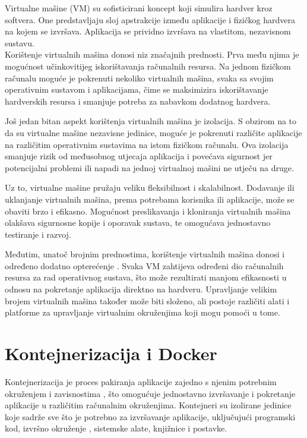 \documentclass[times, utf8, diplomski]{fer}
\begin{document}
Virtualne mašine  (VM) su sofisticirani koncept koji simulira hardver kroz softvera. One predstavljaju sloj apstrakcije između aplikacije i fizičkog hardvera na kojem se izvršava. Aplikacija se prividno izvršava na vlastitom, nezavisnom sustavu. \\

Korištenje virtualnih mašina donosi niz značajnih prednosti. Prva među njima je mogućnost učinkovitijeg iskorištavanja računalnih resursa. Na jednom fizičkom računalu moguće je pokrenuti nekoliko virtualnih mašina, svaka sa svojim operativnim sustavom i aplikacijama, čime se maksimizira iskorištavanje hardverskih resursa i smanjuje potreba za nabavkom dodatnog hardvera.

Još jedan bitan aspekt korištenja virtualnih mašina je izolacija. S obzirom na to da su virtualne mašine nezavisne jedinice, moguće je pokrenuti različite aplikacije na različitim operativnim sustavima na istom fizičkom računalu. Ova izolacija smanjuje rizik od međusobnog utjecaja aplikacija i povećava sigurnost jer potencijalni problemi ili napadi na jednoj virtualnoj mašini ne utječu na druge.

Uz to, virtualne mašine pružaju veliku fleksibilnost i skalabilnost. Dodavanje ili uklanjanje virtualnih mašina, prema potrebama korisnika ili aplikacije, može se obaviti brzo i efikasno. Mogućnost preslikavanja  i kloniranja virtualnih mašina olakšava sigurnosne kopije  i oporavak sustava, te omogućava jednostavno testiranje i razvoj.

Međutim, unatoč brojnim prednostima, korištenje virtualnih mašina donosi i određeno dodatno opterećenje . Svaka VM zahtijeva određeni dio računalnih resursa za rad operativnog sustava, što može rezultirati manjom efikasnosti u odnosu na pokretanje aplikacija direktno na hardveru. Upravljanje velikim brojem virtualnih mašina također može biti složeno, ali postoje različiti alati i platforme za upravljanje virtualnim okruženjima koji mogu pomoći u tome.

\section{Kontejnerizacija i Docker}

Kontejnerizacija je proces pakiranja aplikacije zajedno s njenim potrebnim okruženjem i zavisnostima , što omogućuje jednostavno izvršavanje i pokretanje aplikacije u različitim računalnim okruženjima. Kontejneri su izolirane jedinice koje sadrže sve što je potrebno za izvršavanje aplikacije, uključujući programski kod, izvršno okruženje , sistemske alate, knjižnice i postavke. \\
\end{document}

